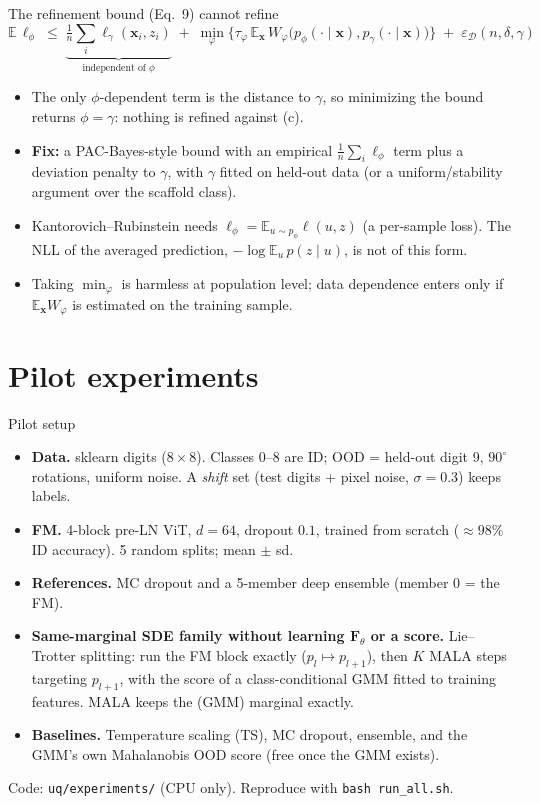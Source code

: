 \documentclass[aspectratio=169,11pt]{beamer}
\newcommand{\E}{\mathbb{E}}
\newcommand{\x}{\bm{x}}
\newcommand{\Ft}{\bm{F}_\theta}
\newcommand{\source}[1]{\par\vfill{\scriptsize\color{ink2}#1}}
\begin{document}
\begin{frame}{The refinement bound (Eq.~9) cannot refine}
  \small
  \[
    \E\,\ell_\phi \;\le\; \underbrace{\tfrac1n\textstyle\sum_i \ell_\gamma(\x_i,z_i)}_{\text{independent of }\phi}
    \;+\;\min_\varphi\Big\{\tau_\varphi\,\E_{\x}\,W_\varphi\big(p_\phi(\cdot\mid\x),p_\gamma(\cdot\mid\x)\big)\Big\}
    \;+\;\varepsilon_{\mathcal D}(n,\delta,\gamma)
  \]
  \begin{itemize}
    \item The only $\phi$-dependent term is the distance to $\gamma$, so minimizing the bound returns \alert{$\phi=\gamma$}: nothing is refined against (c).
    \item \textbf{Fix:} a PAC-Bayes-style bound with an empirical $\tfrac1n\sum_i\ell_\phi$ term plus a deviation penalty to $\gamma$, with $\gamma$ fitted on held-out data (or a uniform/stability argument over the scaffold class).
    \item Kantorovich--Rubinstein needs $\ell_\phi=\E_{u\sim p_\phi}\ell(u,z)$ (a per-sample loss). The NLL of the averaged prediction, $-\log\E_u\,p(z\mid u)$, is not of this form.
    \item Taking $\min_\varphi$ is harmless at population level; data dependence enters only if $\E_{\x}W_\varphi$ is estimated on the training sample.
  \end{itemize}
\end{frame}

\section{Pilot experiments}

\begin{frame}{Pilot setup}
  \small
  \begin{itemize}
    \item \textbf{Data.} sklearn digits ($8\times8$). Classes 0--8 are ID; OOD = held-out digit 9, $90^\circ$ rotations, uniform noise. A \emph{shift} set (test digits + pixel noise, $\sigma=0.3$) keeps labels.
    \item \textbf{FM.} 4-block pre-LN ViT, $d=64$, dropout $0.1$, trained from scratch ($\approx98\%$ ID accuracy). 5 random splits; mean $\pm$ sd.
    \item \textbf{References.} MC dropout and a 5-member deep ensemble (member 0 = the FM).
    \item \textbf{Same-marginal SDE family without learning $\Ft$ or a score.} Lie--Trotter splitting: run the FM block exactly ($p_l\mapsto p_{l+1}$), then $K$ MALA steps targeting $p_{l+1}$, with the score of a class-conditional GMM fitted to training features. MALA keeps the (GMM) marginal exactly.
    \item \textbf{Baselines.} Temperature scaling (TS), MC dropout, ensemble, and the GMM's own Mahalanobis OOD score (free once the GMM exists).
  \end{itemize}
  \source{Code: \texttt{uq/experiments/} (CPU only). Reproduce with \texttt{bash run\_all.sh}.}
\end{frame}
\end{document}
